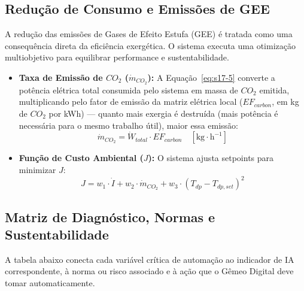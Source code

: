 \documentclass[12pt,a4paper]{article}
\numberwithin{equation}{section}
\numberwithin{table}{section}
\numberwithin{figure}{section}
\begin{document}
\subsection{Redução de Consumo e Emissões de GEE}

A redução das emissões de Gases de Efeito Estufa (GEE) é tratada como uma consequência direta da eficiência exergética. O sistema executa uma otimização multiobjetivo para equilibrar performance e sustentabilidade.

\begin{itemize}
	\item \textbf{Taxa de Emissão de $CO_2$ ($\dot{m}_{CO_2}$):} A Equação~\eqref{eq:s17-5} converte a potência elétrica total consumida pelo sistema em massa de $CO_2$ emitida, multiplicando pelo fator de emissão da matriz elétrica local ($EF_{carbon}$, em kg de $CO_2$ por kWh) — quanto mais exergia é destruída (mais potência é necessária para o mesmo trabalho útil), maior essa emissão:
	\begin{equation}\label{eq:s17-5}
\dot{m}_{CO_2} = \dot{W}_{total} \cdotp EF_{carbon} \quad [\text{kg} \cdotp \text{h}^{-1}]
\end{equation}
	
	\item \textbf{Função de Custo Ambiental ($J$):}
	O sistema ajusta setpoints para minimizar $J$:
	\begin{equation}\label{eq:s17-6}
J = w_1 \cdotp \dot{I} + w_2 \cdotp \dot{m}_{CO_2} + w_3 \cdotp (T_{dp} - T_{dp,set})^2
\end{equation}
\end{itemize}

\subsection{Matriz de Diagnóstico, Normas e Sustentabilidade}

A tabela abaixo conecta cada variável crítica de automação ao indicador de IA correspondente, à norma ou risco associado e à ação que o Gêmeo Digital deve tomar automaticamente.
\begin{table}[h!]
\centering
\noindent{}
\caption{Matriz de diagnóstico, normas associadas e ações de sustentabilidade do Gêmeo Digital.}
\end{table}
\end{document}
